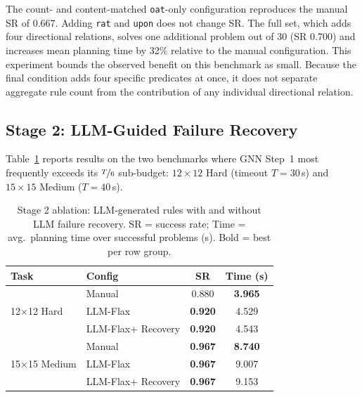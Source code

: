 \documentclass{ieeeaccess}
\newcommand{\tref}[1]{Table~\ref{#1}}
\newcommand{\method}{LLM-Flax\xspace}
\begin{document}
The count- and content-matched \texttt{oat}-only configuration reproduces the manual SR of 0.667. Adding \texttt{rat} and \texttt{upon} does not change SR.
The full set, which adds four directional relations, solves one additional problem out of 30 (SR 0.700) and increases mean planning time by 32\% relative to the manual configuration.
This experiment bounds the observed benefit on this benchmark as small. Because the final condition adds four specific predicates at once, it does not separate aggregate rule count from the contribution of any individual directional relation.

\subsection{Stage 2: LLM-Guided Failure Recovery}
\label{sec:results_stage2}

\tref{tab:stage2} reports results on the two benchmarks where GNN Step~1 most frequently exceeds its $\nicefrac{T}{6}$ sub-budget: $12{\times}12$ Hard (timeout $T{=}30$\,s) and $15{\times}15$ Medium ($T{=}40$\,s).

\begin{table}[t]
    \centering
    \caption{Stage 2 ablation: LLM-generated rules with and without LLM failure recovery. SR = success rate; Time = avg.\ planning time over successful problems (s). Bold = best per row group.}
    \label{tab:stage2}
    \small
    \setlength{\tabcolsep}{4pt}
    \renewcommand{\arraystretch}{1.1}
    \begin{tabular}{llcc}
        \toprule
        \textbf{Task} & \textbf{Config} & \textbf{SR} & \textbf{Time (s)} \\
        \midrule
        \multirow{3}{*}{12$\times$12 Hard}
            & Manual              & 0.880          & \textbf{3.965} \\
            & \method             & \textbf{0.920} & 4.529 \\
            & \method + Recovery  & \textbf{0.920} & 4.543 \\
        \midrule
        \multirow{3}{*}{15$\times$15 Medium}
            & Manual              & \textbf{0.967} & \textbf{8.740} \\
            & \method             & \textbf{0.967} & 9.007 \\
            & \method + Recovery  & \textbf{0.967} & 9.153 \\
        \bottomrule
    \end{tabular}
\end{table}
\end{document}
